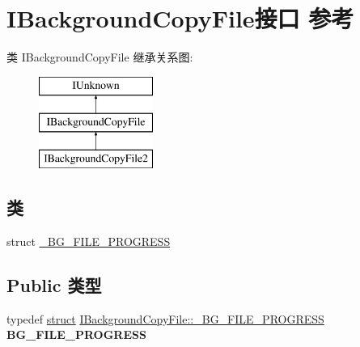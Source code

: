 \hypertarget{interface_i_background_copy_file}{}\section{I\+Background\+Copy\+File接口 参考}
\label{interface_i_background_copy_file}
类 I\+Background\+Copy\+File 继承关系图\+:\begin{figure}[H]
\begin{center}
\leavevmode
\includegraphics[height=3.000000cm]{interface_i_background_copy_file}
\end{center}
\end{figure}
\subsection*{类}
\begin{DoxyCompactItemize}
\item 
struct \hyperlink{struct_i_background_copy_file_1_1___b_g___f_i_l_e___p_r_o_g_r_e_s_s}{\+\_\+\+B\+G\+\_\+\+F\+I\+L\+E\+\_\+\+P\+R\+O\+G\+R\+E\+SS}
\end{DoxyCompactItemize}
\subsection*{Public 类型}
\begin{DoxyCompactItemize}
\item 
\mbox{\label{interface_i_background_copy_file_a158680e01d8cd10b22b131f42682df3e}} 
typedef \hyperlink{interfacestruct}{struct} \hyperlink{struct_i_background_copy_file_1_1___b_g___f_i_l_e___p_r_o_g_r_e_s_s}{I\+Background\+Copy\+File\+::\+\_\+\+B\+G\+\_\+\+F\+I\+L\+E\+\_\+\+P\+R\+O\+G\+R\+E\+SS} {\bfseries B\+G\+\_\+\+F\+I\+L\+E\+\_\+\+P\+R\+O\+G\+R\+E\+SS}
\end{DoxyCompactItemize}
